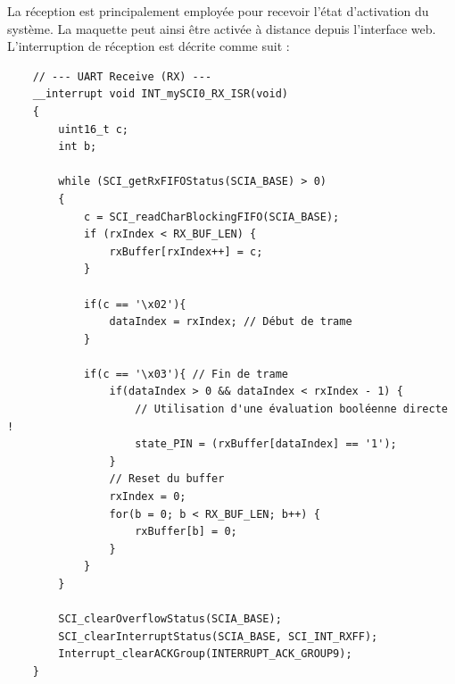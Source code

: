 La réception est principalement employée pour recevoir l'état d'activation du système. La maquette peut ainsi être activée à distance depuis l'interface web. L'interruption de réception est décrite comme suit :

\begin{verbatim}
    // --- UART Receive (RX) ---
    __interrupt void INT_mySCI0_RX_ISR(void)
    {
        uint16_t c;
        int b;

        while (SCI_getRxFIFOStatus(SCIA_BASE) > 0)
        {
            c = SCI_readCharBlockingFIFO(SCIA_BASE);
            if (rxIndex < RX_BUF_LEN) {
                rxBuffer[rxIndex++] = c;
            }

            if(c == '\x02'){
                dataIndex = rxIndex; // Début de trame
            }

            if(c == '\x03'){ // Fin de trame
                if(dataIndex > 0 && dataIndex < rxIndex - 1) {
                    // Utilisation d'une évaluation booléenne directe !
                    state_PIN = (rxBuffer[dataIndex] == '1');
                }
                // Reset du buffer
                rxIndex = 0;
                for(b = 0; b < RX_BUF_LEN; b++) {
                    rxBuffer[b] = 0;
                }
            }
        }

        SCI_clearOverflowStatus(SCIA_BASE);
        SCI_clearInterruptStatus(SCIA_BASE, SCI_INT_RXFF);
        Interrupt_clearACKGroup(INTERRUPT_ACK_GROUP9);
    }
\end{verbatim}